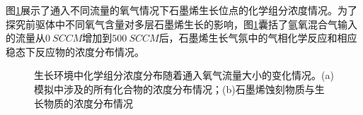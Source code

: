 图\ref{fig:FLG_chemkin}展示了通入不同流量的氧气情况下石墨烯生长位点的化学组分浓度情况。为了探究前驱体中不同氧气含量对多层石墨烯生长的影响，图\ref{fig:FLG_chemkin}囊括了氩氧混合气输入的流量从$\SI{0}{SCCM}$增加到$\SI{500}{SCCM}$后，石墨烯生长气氛中的气相化学反应和相应稳态下反应物的浓度分布情况。

\begin{figure}[htb]
    \caption{生长环境中化学组分浓度分布随着通入氧气流量大小的变化情况。(a)模拟中涉及的所有化合物的浓度分布情况；(b)石墨烯蚀刻物质与生长物质的浓度分布情况}
    \label{fig:FLG_chemkin}
\end{figure}


